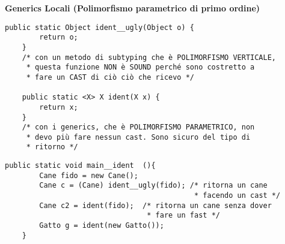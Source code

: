 \noindent \textbf{Generics Locali (Polimorfismo parametrico di primo ordine)} 

\begin{lstlisting}[basicstyle=\small,]
    public static Object ident__ugly(Object o) {
        return o;
    }   
    /* con un metodo di subtyping che è POLIMORFISMO VERTICALE, 
     * questa funzione NON è SOUND perché sono costretto a 
     * fare un CAST di ciò ciò che ricevo */

    public static <X> X ident(X x) {
        return x;
    }   
    /* con i generics, che è POLIMORFISMO PARAMETRICO, non
     * devo più fare nessun cast. Sono sicuro del tipo di
     * ritorno */
\end{lstlisting}

\begin{lstlisting}[basicstyle=\small,]
	public static void main__ident	(){
		Cane fido = new Cane();
		Cane c = (Cane) ident__ugly(fido); /* ritorna un cane 
											* facendo un cast */
		Cane c2 = ident(fido);  /* ritorna un cane senza dover 
								 * fare un fast */ 
		Gatto g = ident(new Gatto());
	}
\end{lstlisting}





















